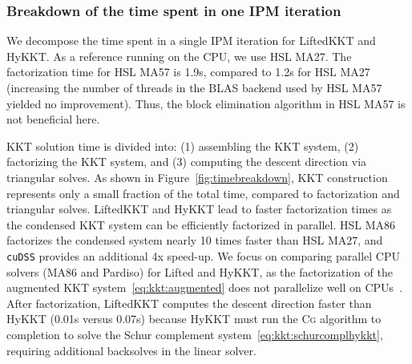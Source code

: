 \documentclass[smallextended]{svjour3}
\newcommand{\CG}{\textsc{Cg}\xspace}
\begin{document}
\subsubsection{Breakdown of the time spent in one IPM iteration}
We decompose the time spent in a single IPM iteration for LiftedKKT and HyKKT.
As a reference running on the CPU, we use HSL MA27.
The factorization time for HSL MA57 is 1.9s, compared to 1.2s for HSL MA27
(increasing the number of threads in the BLAS backend used by HSL MA57 yielded no improvement).
Thus, the block elimination algorithm in HSL MA57 is not beneficial here.

KKT solution time is divided into:
(1) assembling the KKT system,
(2) factorizing the KKT system, and (3) computing the descent direction via triangular solves.
As shown in Figure~\ref{fig:timebreakdown}, KKT construction represents only
a small fraction of the total time, compared to factorization and triangular solves.
LiftedKKT and HyKKT lead to faster factorization times
as the condensed KKT system can be efficiently factorized in parallel. HSL MA86
factorizes the condensed system nearly 10 times faster than HSL MA27, and
{\tt cuDSS} provides an additional 4x speed-up.
We focus on comparing parallel CPU solvers (MA86 and Pardiso) for Lifted and HyKKT,
as the factorization of the augmented KKT system~\eqref{eq:kkt:augmented}
does not parallelize well on CPUs~\cite{tasseff2019exploring}.
After factorization, LiftedKKT computes the descent direction faster than HyKKT
(0.01s versus 0.07s) because HyKKT must run the \CG algorithm to completion to solve the Schur complement
system~\eqref{eq:kkt:schurcomplhykkt}, requiring additional backsolves in the linear solver.
\end{document}
